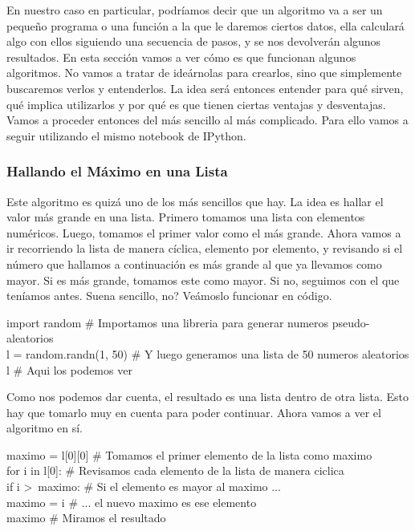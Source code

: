 \documentclass[10pt,letterpaper]{article}
\newenvironment{Code}
{
\begin{lrbox}{\selvestebox}%
\begin{minipage}{\dimexpr\columnwidth-2\fboxsep\relax}
\fontfamily{\ttdefault}\selectfont
}
{\end{minipage}\end{lrbox}%
\begin{center}
\colorbox{light-gray}{\usebox{\selvestebox}}
\end{center}
}
\begin{document}
En nuestro caso en particular, podr\'iamos decir que un algoritmo va a ser un peque\~no programa o una funci\'on a la que le daremos ciertos datos, ella calcular\'a algo con ellos siguiendo una secuencia de pasos, y se nos devolver\'an algunos resultados. En esta secci\'on vamos a ver c\'omo es que funcionan algunos algoritmos. No vamos a tratar de ide\'arnolas para crearlos, sino que simplemente buscaremos verlos y entenderlos. La idea ser\'a entonces entender para qu\'e sirven, qu\'e implica utilizarlos y por qu\'e es que tienen ciertas ventajas y desventajas. Vamos a proceder entonces del m\'as sencillo al m\'as complicado. Para ello vamos a seguir utilizando el mismo notebook de IPython.

\subsubsection{Hallando el M\'aximo en una Lista}
Este algoritmo es quiz\'a uno de los m\'as sencillos que hay. La idea es hallar el valor m\'as grande en una lista. Primero tomamos una lista con elementos num\'ericos. Luego, tomamos el primer valor como el m\'as grande. Ahora vamos a ir recorriendo la lista de manera c\'iclica, elemento por elemento, y revisando si el n\'umero que hallamos a continuaci\'on es m\'as grande al que ya llevamos como mayor. Si es m\'as grande, tomamos este como mayor. Si no, seguimos con el que ten\'iamos antes. Suena sencillo, no? Ve\'amoslo funcionar en c\'odigo.

\begin{small}
\begin{Code}
import random \# Importamos una libreria para generar numeros pseudo-aleatorios\\
l = random.randn(1, 50) \# Y luego generamos una lista de 50 numeros aleatorios\\
l \# Aqui los podemos ver
\end{Code}
\end{small}

Como nos podemos dar cuenta, el resultado es una lista dentro de otra lista. Esto hay que tomarlo muy en cuenta para poder continuar. Ahora vamos a ver el algoritmo en s\'i.

\begin{small}
\begin{Code}
maximo = l[0][0] \# Tomamos el primer elemento de la lista como maximo\\
for i in l[0]: \# Revisamos cada elemento de la lista de manera ciclica\\
\hspace*{4mm} if i >\ maximo: \# Si el elemento es mayor al maximo ...\\
\hspace*{12mm} maximo = i \# ... el nuevo maximo es ese elemento\\
maximo \# Miramos el resultado
\end{Code}
\end{small}
\end{document}
